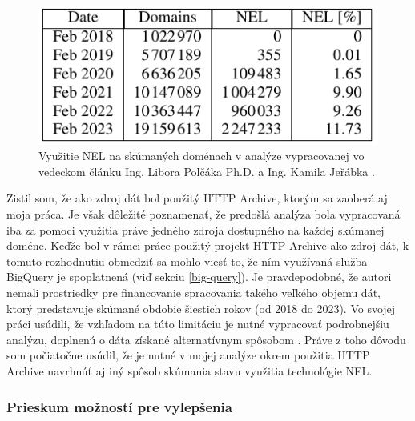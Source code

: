 \begin{figure}[!htb]
\begin{center}
    \includegraphics[width=0.55\linewidth]{obrazky-figures/polcak-analysis-hd.pdf}
    \caption{\centering Využitie NEL na skúmaných doménach v analýze vypracovanej vo vedeckom článku Ing. Libora Polčáka Ph.D. a Ing. Kamila Jeřábka \cite{nel-http-archive}.}
    \label{fig:polcak-analysis}
\end{center}
\end{figure}

\pagebreak

Zistil som, že ako zdroj dát bol použitý HTTP Archive, ktorým sa zaoberá aj moja práca.
Je však dôležité poznamenať, že predošlá analýza bola vypracovaná iba za pomoci využitia 
práve jedného zdroja dostupného na každej skúmanej doméne.
Keďže bol v rámci práce použitý projekt HTTP Archive ako zdroj dát, k tomuto rozhodnutiu obmedziť sa mohlo viesť to, 
že ním využívaná služba BigQuery je spoplatnená (viď sekciu \ref{big-query}). 
Je pravdepodobné, že autori nemali prostriedky pre financovanie spracovania takého veľkého objemu dát, 
ktorý predstavuje skúmané obdobie šiestich rokov (od 2018 do 2023).
Vo svojej práci usúdili, že vzhľadom na túto limitáciu je nutné vypracovať podrobnejšiu analýzu, 
doplnenú o dáta získané alternatívnym spôsobom \cite{nel-http-archive}.
Práve z toho dôvodu som počiatočne usúdil, že je nutné v mojej analýze okrem použitia HTTP Archive navrhnúť 
aj iný spôsob skúmania stavu využitia technológie NEL.

\subsubsection{Prieskum možností pre vylepšenia}

